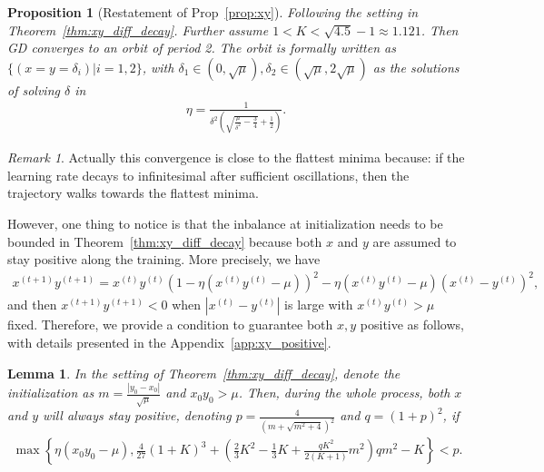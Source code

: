 \documentclass{article}
\theoremstyle{plain}
\newtheorem{lemma}{Lemma}
\newtheorem{prop}{Proposition}
\theoremstyle{remark}
\newtheorem*{remark}{Remark}
\newenvironment{sketch}{\paragraph{Proof sketch}}{\hfill$\square$}
\def\t{^{(t)}}
\def\tt{^{(t+1)}}
\newcommand{\fix}[1]{\noindent{\color{blue}{#1}}}
\begin{document}
\begin{prop}[Restatement of Prop~\ref{prop:xy}]
    Following the setting in Theorem~\ref{thm:xy_diff_decay}. Further assume $1<K<\sqrt{4.5}-1\approx 1.121$. Then GD converges to an orbit of period 2. The orbit is formally written as $\{(x=y=\delta_i)|i=1,2\}$, with $\delta_1\in(0,\sqrt{\mu}), \delta_2\in(\sqrt{\mu},2\sqrt{\mu})$  as the solutions of solving $\delta$ in
\begin{align*}
    \eta  = \frac{1}{\delta^2\left( \sqrt{\frac{\mu}{\delta^2}-\frac{3}{4}} +\frac{1}{2}\right)}.
\end{align*}
\label{prop:xy_2}
\end{prop}

\begin{remark}
    Actually this convergence is close to the flattest minima because: if the learning rate decays to infinitesimal after sufficient oscillations, then the trajectory walks towards the flattest minima.
\end{remark}

However, one thing to notice is that the inbalance at initialization needs to be bounded in Theorem~\ref{thm:xy_diff_decay} because both $x$ and $y$ are assumed to stay positive along the training. More precisely, we have
\begin{align}
    x\tt y\tt = x\t y\t (1-\eta(x\t y\t-\mu))^2 - \eta(x\t y\t-\mu)(x\t-y\t)^2,
\end{align}
and then $x\tt y\tt<0$ when $|x\t-y\t|$ is large with $x\t y\t >\mu$ fixed. Therefore, we provide a condition to guarantee both $x,y$ positive as follows, with details presented in the Appendix~\ref{app:xy_positive}.
\begin{lemma}
In the setting of Theorem~\ref{thm:xy_diff_decay}, denote the initialization as $m=\frac{|y_0-x_0|}{\sqrt{\mu}}$ and $x_0 y_0>\mu$. Then, during the whole process, both $x$ and $y$ will always stay positive, denoting $p=\frac{4}{\left( m+\sqrt{m^2+4} \right)^2}$ and $q=(1+p)^2$, if
\begin{align*}
    \max\left\{
    \eta(x_0 y_0-\mu),
    \frac{4}{27}\left(1+K\right)^3+\left(\frac{2}{3}K^2-\frac{1}{3}K+\frac{q K^2}{2(K+1)}m^2\right)q m^2-K
    \right\}
    <
    p.
\end{align*}
\label{thm:xy_positive}
\end{lemma}

\end{document}
